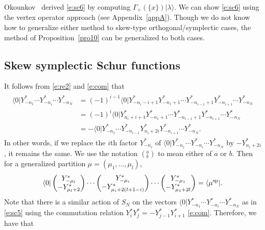 \documentclass[10pt,a4paper]{amsart}
\numberwithin{equation}{section}
\begin{document}
\begin{Remark}
Okounkov~\cite{Oko2001} derived %
\eqref{e:sc6} by %
computing $\Gamma_+(\{x\})|\lambda\rangle$. We can show \eqref{e:sc6} using the vertex operator approach (see Appendix~\ref{appA}). Though
we do not know how to generalize either method to skew-type orthogonal/symplectic cases, the method of Proposition~\ref{pro10} can be generalized to both cases.
\end{Remark}

\subsection{Skew symplectic Schur functions} It follows from \eqref{e:re2} and \eqref{e:com} that
\begin{align*}
\begin{aligned}
\langle 0|Y^*_{-n_1}\cdots Y^*_{-n_i}\cdots Y^*_{-n_N}&{}=(-1)^{i-1}\langle 0|Y^*_{-n_i-i+1}Y^*_{-n_1+1}\cdots Y^*_{-n_{i-1}+1}Y^*_{-n_{i+1}}\cdots Y^*_{-n_N}\\
&{}= (-1)^i\langle 0|Y^*_{n_i+i+1}Y^*_{-n_1+1}\cdots Y^*_{-n_{i-1}+1}Y^*_{-n_{i+1}}\cdots Y^*_{-n_N}\\
&{}= -\langle 0|Y^*_{-n_1}\cdots Y^*_{-n_{i-1}}Y^*_{n_i+2i}Y^*_{-n_{i+1}}\cdots Y^*_{-n_N}.
\end{aligned}
\end{align*}
In other words, if we replace the $i$th factor $Y^*_{-n_i}$ of $\langle 0|Y^*_{-n_1}\cdots Y^*_{-n_i}\cdots Y^*_{-n_N}$ by $-Y^*_{n_i+2i}$, it remains the same. We use the notation $(^a_b)$ to mean either of $a$ or $b$. Then for a generalized partition $\mu=(\mu_1,\dots, \mu_l)$,
\begin{align*}
\langle 0|\begin{pmatrix}{Y^*_{-\mu_l}}\\{-Y^*_{\mu_l+2}}\end{pmatrix}\cdots \begin{pmatrix}{Y^*_{-\mu_i}}\\{-Y^*_{\mu_i+2(l+1-i)}}\end{pmatrix}\cdots \begin{pmatrix}{Y^*_{-\mu_1}}\\{-Y^*_{\mu_1+2l}}\end{pmatrix}=\langle\mu^{\rm sp}|.
\end{align*}
Note that there is a similar action of $S_N$ on the vectors $\langle 0|Y^*_{-n_1}\cdots Y^*_{-n_i}\cdots Y^*_{-n_N}$
as in \eqref{e:sc5} using the commutation relation $Y^*_iY^*_j=-Y^*_{j-1}Y^*_{i+1}$ \eqref{e:com}. Therefore, we have that
\end{document}
